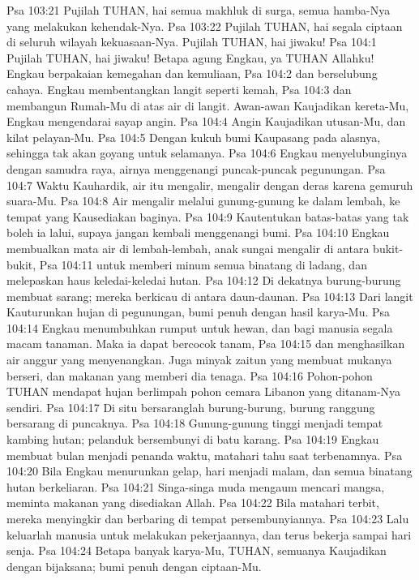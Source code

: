 Psa 103:21  Pujilah TUHAN, hai semua makhluk di surga, semua hamba-Nya yang melakukan kehendak-Nya.
Psa 103:22  Pujilah TUHAN, hai segala ciptaan di seluruh wilayah kekuasaan-Nya. Pujilah TUHAN, hai jiwaku!
Psa 104:1  Pujilah TUHAN, hai jiwaku! Betapa agung Engkau, ya TUHAN Allahku! Engkau berpakaian kemegahan dan kemuliaan,
Psa 104:2  dan berselubung cahaya. Engkau membentangkan langit seperti kemah,
Psa 104:3  dan membangun Rumah-Mu di atas air di langit. Awan-awan Kaujadikan kereta-Mu, Engkau mengendarai sayap angin.
Psa 104:4  Angin Kaujadikan utusan-Mu, dan kilat pelayan-Mu.
Psa 104:5  Dengan kukuh bumi Kaupasang pada alasnya, sehingga tak akan goyang untuk selamanya.
Psa 104:6  Engkau menyelubunginya dengan samudra raya, airnya menggenangi puncak-puncak pegunungan.
Psa 104:7  Waktu Kauhardik, air itu mengalir, mengalir dengan deras karena gemuruh suara-Mu.
Psa 104:8  Air mengalir melalui gunung-gunung ke dalam lembah, ke tempat yang Kausediakan baginya.
Psa 104:9  Kautentukan batas-batas yang tak boleh ia lalui, supaya jangan kembali menggenangi bumi.
Psa 104:10  Engkau membualkan mata air di lembah-lembah, anak sungai mengalir di antara bukit-bukit,
Psa 104:11  untuk memberi minum semua binatang di ladang, dan melepaskan haus keledai-keledai hutan.
Psa 104:12  Di dekatnya burung-burung membuat sarang; mereka berkicau di antara daun-daunan.
Psa 104:13  Dari langit Kauturunkan hujan di pegunungan, bumi penuh dengan hasil karya-Mu.
Psa 104:14  Engkau menumbuhkan rumput untuk hewan, dan bagi manusia segala macam tanaman. Maka ia dapat bercocok tanam,
Psa 104:15  dan menghasilkan air anggur yang menyenangkan. Juga minyak zaitun yang membuat mukanya berseri, dan makanan yang memberi dia tenaga.
Psa 104:16  Pohon-pohon TUHAN mendapat hujan berlimpah pohon cemara Libanon yang ditanam-Nya sendiri.
Psa 104:17  Di situ bersaranglah burung-burung, burung ranggung bersarang di puncaknya.
Psa 104:18  Gunung-gunung tinggi menjadi tempat kambing hutan; pelanduk bersembunyi di batu karang.
Psa 104:19  Engkau membuat bulan menjadi penanda waktu, matahari tahu saat terbenamnya.
Psa 104:20  Bila Engkau menurunkan gelap, hari menjadi malam, dan semua binatang hutan berkeliaran.
Psa 104:21  Singa-singa muda mengaum mencari mangsa, meminta makanan yang disediakan Allah.
Psa 104:22  Bila matahari terbit, mereka menyingkir dan berbaring di tempat persembunyiannya.
Psa 104:23  Lalu keluarlah manusia untuk melakukan pekerjaannya, dan terus bekerja sampai hari senja.
Psa 104:24  Betapa banyak karya-Mu, TUHAN, semuanya Kaujadikan dengan bijaksana; bumi penuh dengan ciptaan-Mu.
